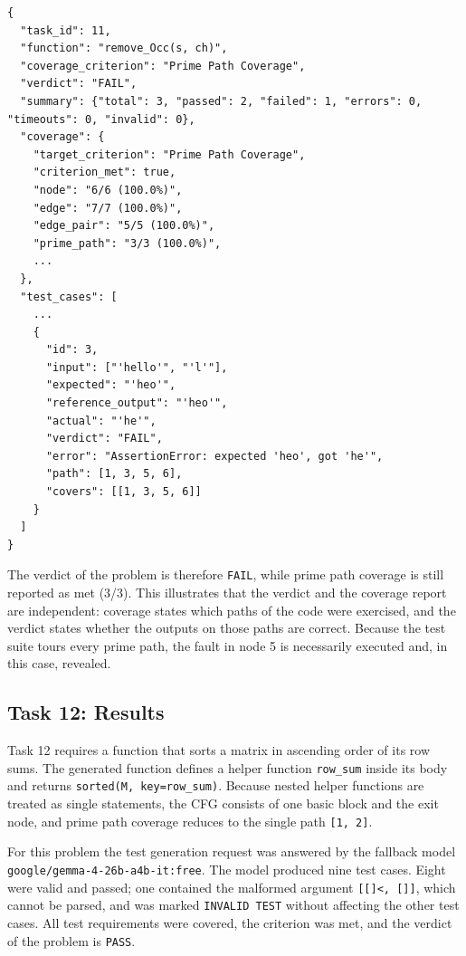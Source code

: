 \documentclass[11pt, a4paper]{article}
\newcommand{\breakpath}[1]{\nolinkurl{#1}}
\begin{document}
\begin{lstlisting}[style=text, caption={Excerpt of the results file for the faulty implementation of task 11}, label={lst:faultyjson}]
{
  "task_id": 11,
  "function": "remove_Occ(s, ch)",
  "coverage_criterion": "Prime Path Coverage",
  "verdict": "FAIL",
  "summary": {"total": 3, "passed": 2, "failed": 1, "errors": 0, "timeouts": 0, "invalid": 0},
  "coverage": {
    "target_criterion": "Prime Path Coverage",
    "criterion_met": true,
    "node": "6/6 (100.0%)",
    "edge": "7/7 (100.0%)",
    "edge_pair": "5/5 (100.0%)",
    "prime_path": "3/3 (100.0%)",
    ...
  },
  "test_cases": [
    ...
    {
      "id": 3,
      "input": ["'hello'", "'l'"],
      "expected": "'heo'",
      "reference_output": "'heo'",
      "actual": "'he'",
      "verdict": "FAIL",
      "error": "AssertionError: expected 'heo', got 'he'",
      "path": [1, 3, 5, 6],
      "covers": [[1, 3, 5, 6]]
    }
  ]
}
\end{lstlisting}

The verdict of the problem is therefore \texttt{FAIL}, while prime path coverage is still reported as met (3/3). This illustrates that the verdict and the coverage report are independent: coverage states which paths of the code were exercised, and the verdict states whether the outputs on those paths are correct. Because the test suite tours every prime path, the fault in node 5 is necessarily executed and, in this case, revealed.

\subsection{Task 12: Results}

Task 12 requires a function that sorts a matrix in ascending order of its row sums. The generated function defines a helper function \texttt{row\_sum} inside its body and returns \texttt{sorted(M, key=row\_sum)}. Because nested helper functions are treated as single statements, the CFG consists of one basic block and the exit node, and prime path coverage reduces to the single path \texttt{[1, 2]}.

For this problem the test generation request was answered by the fallback model \breakpath{google/gemma-4-26b-a4b-it:free}. The model produced nine test cases. Eight were valid and passed; one contained the malformed argument \texttt{[[]<, []]}, which cannot be parsed, and was marked \texttt{INVALID TEST} without affecting the other test cases. All test requirements were covered, the criterion was met, and the verdict of the problem is \texttt{PASS}.
\end{document}
